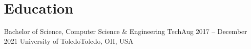 \section{Education}
\mySubHeadingListStart

  \mySubHeading
    {Bachelor of Science, Computer Science \& Engineering Tech}{Aug 2017 -- December 2021}
    { University of Toledo}{Toledo, OH, USA}
    \myItemListStart
    \myItemListEnd

\mySubHeadingListEnd
